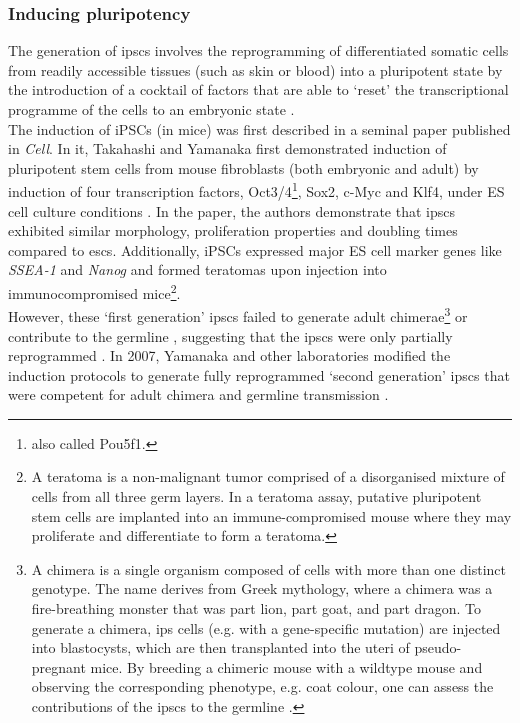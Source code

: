 \newpage

\subsubsection{Inducing pluripotency}

The generation of \glspl{ipsc} involves the reprogramming of differentiated somatic cells from readily accessible tissues (such as skin or blood) into a pluripotent state by the introduction of a cocktail of factors that are able to `reset' the transcriptional programme of the cells to an embryonic state \cite{saha2009technical}. \\

The induction of iPSCs (in mice)
was first described in 
a seminal paper published in \textit{Cell}.
In it, Takahashi and Yamanaka first demonstrated induction of pluripotent stem cells from mouse fibroblasts (both embryonic and adult) by induction of four transcription factors, Oct3/4\footnote{also called Pou5f1.}, Sox2, c-Myc and Klf4, under ES cell culture conditions \cite{takahashi2006induction}.
In the paper, the authors demonstrate that \glspl{ipsc} exhibited similar morphology, proliferation properties and doubling times compared to \glspl{esc}.
Additionally, iPSCs expressed major ES cell marker genes like \textit{SSEA-1} and \textit{Nanog} and formed teratomas upon injection into immunocompromised mice\footnote{A teratoma is a non-malignant tumor comprised of a disorganised mixture of cells from all three germ layers. 
In a teratoma assay, putative pluripotent stem cells are implanted into an immune-compromised mouse where they may proliferate and differentiate to form a teratoma. }.\\ 

However, these `first generation' \glspl{ipsc} failed to generate adult chimerae\footnote{A chimera is a single organism composed of cells with more than one distinct genotype.
The name derives from Greek mythology, where a chimera was a fire-breathing monster that was part lion, part goat, and part dragon. 
To generate a chimera, \gls{ips} cells (e.g. with a gene-specific mutation) are injected into blastocysts, which are then transplanted into the uteri of pseudo-pregnant mice.
By breeding a chimeric mouse with a wildtype mouse and observing the corresponding phenotype, e.g. coat colour, one can assess the contributions of the \glspl{ipsc} to the germline \cite{okita2007generation}.} or contribute to the germline \cite{takahashi2006induction}, suggesting that the \glspl{ipsc} were only partially reprogrammed \cite{omole2018ten}. 
In 2007, Yamanaka and other laboratories modified the induction protocols to generate fully reprogrammed `second generation' \glspl{ipsc} that were competent for adult chimera and germline transmission \cite{maherali2007directly, wernig2007vitro, okita2007generation}.\\

